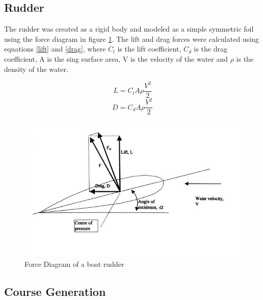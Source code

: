 
\subsection{Rudder}
The rudder was created as a rigid body and modeled as a simple symmetric foil using the force diagram in figure \ref{rudderForce}. The lift and drag forces were calculated using equations \ref{lift} and \ref{drag}, where ${C_l}$ is the lift coefficient, ${C_d}$ is the drag coefficient, A is the sing surface area, V is the velocity of the water and ${\rho}$ is the density of the water.



\begin{equation}
    L = {C_l}A\rho\frac{V^2}{2}
    \label{lift}
\end{equation}
\begin{equation}
    D = {C_d}A\rho\frac{V^2}{2}
    \label{drag}
\end{equation}
 
\begin{figure}
    \centering
    \includegraphics{chapters/chapter04/rudder.JPG}
    \caption{Force Diagram of a boat rudder}
    \label{rudderForce}
\end{figure}

\subsection{Course Generation}

